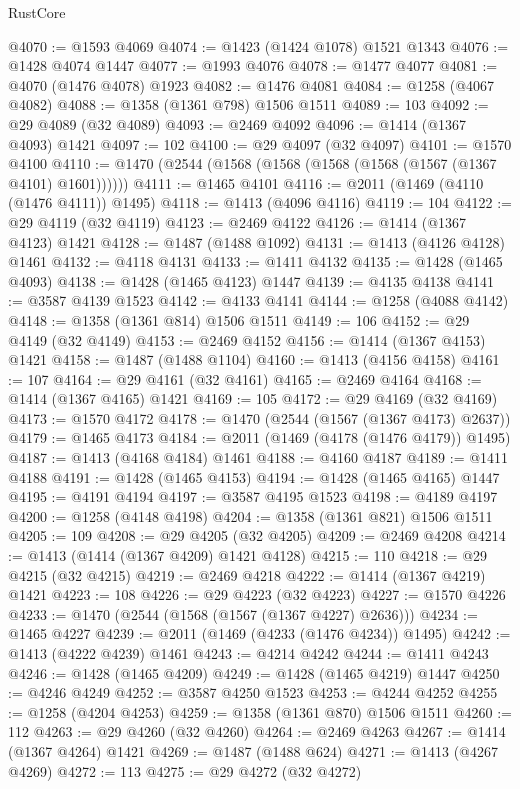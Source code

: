 \begin{lexlean}{RustCore}
\begin{coremodule}
@4070 := @1593 @4069
@4074 := @1423 (@1424 @1078) @1521 @1343
@4076 := @1428 @4074 @1447
@4077 := @1993 @4076
@4078 := @1477 @4077
@4081 := @4070 (@1476 @4078) @1923
@4082 := @1476 @4081
@4084 := @1258 (@4067 @4082)
@4088 := @1358 (@1361 @798) @1506 @1511
@4089 := 103
@4092 := @29 @4089 (@32 @4089)
@4093 := @2469 @4092
@4096 := @1414 (@1367 @4093) @1421
@4097 := 102
@4100 := @29 @4097 (@32 @4097)
@4101 := @1570 @4100
@4110 := @1470 (@2544 (@1568 (@1568 (@1568 (@1568 (@1567 (@1367 @4101) @1601))))))
@4111 := @1465 @4101
@4116 := @2011 (@1469 (@4110 (@1476 @4111)) @1495)
@4118 := @1413 (@4096 @4116)
@4119 := 104
@4122 := @29 @4119 (@32 @4119)
@4123 := @2469 @4122
@4126 := @1414 (@1367 @4123) @1421
@4128 := @1487 (@1488 @1092)
@4131 := @1413 (@4126 @4128) @1461
@4132 := @4118 @4131
@4133 := @1411 @4132
@4135 := @1428 (@1465 @4093)
@4138 := @1428 (@1465 @4123) @1447
@4139 := @4135 @4138
@4141 := @3587 @4139 @1523
@4142 := @4133 @4141
@4144 := @1258 (@4088 @4142)
@4148 := @1358 (@1361 @814) @1506 @1511
@4149 := 106
@4152 := @29 @4149 (@32 @4149)
@4153 := @2469 @4152
@4156 := @1414 (@1367 @4153) @1421
@4158 := @1487 (@1488 @1104)
@4160 := @1413 (@4156 @4158)
@4161 := 107
@4164 := @29 @4161 (@32 @4161)
@4165 := @2469 @4164
@4168 := @1414 (@1367 @4165) @1421
@4169 := 105
@4172 := @29 @4169 (@32 @4169)
@4173 := @1570 @4172
@4178 := @1470 (@2544 (@1567 (@1367 @4173) @2637))
@4179 := @1465 @4173
@4184 := @2011 (@1469 (@4178 (@1476 @4179)) @1495)
@4187 := @1413 (@4168 @4184) @1461
@4188 := @4160 @4187
@4189 := @1411 @4188
@4191 := @1428 (@1465 @4153)
@4194 := @1428 (@1465 @4165) @1447
@4195 := @4191 @4194
@4197 := @3587 @4195 @1523
@4198 := @4189 @4197
@4200 := @1258 (@4148 @4198)
@4204 := @1358 (@1361 @821) @1506 @1511
@4205 := 109
@4208 := @29 @4205 (@32 @4205)
@4209 := @2469 @4208
@4214 := @1413 (@1414 (@1367 @4209) @1421 @4128)
@4215 := 110
@4218 := @29 @4215 (@32 @4215)
@4219 := @2469 @4218
@4222 := @1414 (@1367 @4219) @1421
@4223 := 108
@4226 := @29 @4223 (@32 @4223)
@4227 := @1570 @4226
@4233 := @1470 (@2544 (@1568 (@1567 (@1367 @4227) @2636)))
@4234 := @1465 @4227
@4239 := @2011 (@1469 (@4233 (@1476 @4234)) @1495)
@4242 := @1413 (@4222 @4239) @1461
@4243 := @4214 @4242
@4244 := @1411 @4243
@4246 := @1428 (@1465 @4209)
@4249 := @1428 (@1465 @4219) @1447
@4250 := @4246 @4249
@4252 := @3587 @4250 @1523
@4253 := @4244 @4252
@4255 := @1258 (@4204 @4253)
@4259 := @1358 (@1361 @870) @1506 @1511
@4260 := 112
@4263 := @29 @4260 (@32 @4260)
@4264 := @2469 @4263
@4267 := @1414 (@1367 @4264) @1421
@4269 := @1487 (@1488 @624)
@4271 := @1413 (@4267 @4269)
@4272 := 113
@4275 := @29 @4272 (@32 @4272)

\end{coremodule}
\end{lexlean}
